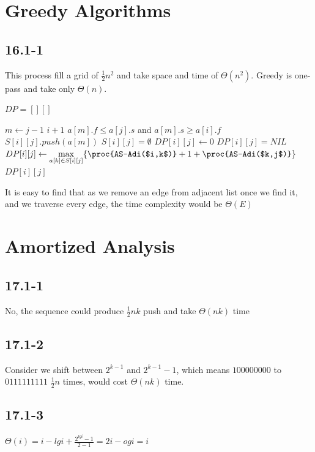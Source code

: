\documentclass[]{article}
\begin{document}
\section{Greedy Algorithms}
\subsection{16.1-1}

This process fill a grid of $\frac{1}{2}n^2$ and take space and time of $\Theta(n^2)$. Greedy is one-pass and take only $\Theta(n)$.

\begin{codebox}
	\li $DP = [][]$
	\li \Return {}
\end{codebox}

\begin{codebox}
	\li \For $m \leftarrow j-1$ \Downto $i+1$
	\li \Do \If $a[m].f \le a[j].s$ and $a[m].s \ge a[i].f$
	\li \Then $S[i][j].push(a[m])$ \End \End
	\li \If $S[i][j] = \emptyset$ 
	\li \Then $DP[i][j] \leftarrow 0$
	\li \Else 
	\li \If $DP[i][j] = NIL$
	\li \Then $DP[i][j] \leftarrow \underset{a[k] \in S[i][j]}{\max} \{\proc{AS-Adi($i,k$)} + 1 + \proc{AS-Adi($k,j$)} \} $ \End \End
	\li \Return $DP[i][j]$
	
\end{codebox}

It is easy to find that as we remove an edge from adjacent list once we find it, and we traverse every edge, the time complexity would be $\Theta(E)$

\section{Amortized Analysis}
\subsection{17.1-1}
No, the sequence could produce $\frac{1}{2}nk$ push and take $\Theta(nk)$ time

\subsection{17.1-2}
Consider we shift between $2^{k-1}$ and $2^{k-1} - 1$, which means $100000000$ to $0111111111$ $\frac{1}{2}n$ times, would cost $\Theta(nk)$ time.

\subsection{17.1-3}
$\Theta(i) = i - lgi + \frac{2^{lgi}-1}{2-1} = 2i - ogi = i$
\end{document}
